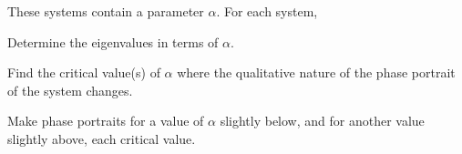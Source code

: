 \documentclass[12pt,twoside]{exam}
\begin{document}
\begin{questions}
    
    \newpage

    \question These systems contain a parameter $\alpha$. For each system,
    \begin{compactenum}[i.]
        \item Determine the eigenvalues in terms of $\alpha$.
        \item Find the critical value(s) of $\alpha$ where the qualitative 
        nature of the phase portrait of the system changes.
        \item Make phase portraits for a value of $\alpha$ slightly below, and for another value slightly above, each critical value.
    \end{compactenum}

\end{questions}
\end{document}
